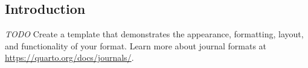 \documentclass{juliacon}
\begin{document}
\hypertarget{sec-intro}{%
\subsection{Introduction}\label{sec-intro}}

\emph{TODO} Create a template that demonstrates the appearance,
formatting, layout, and functionality of your format. Learn more about
journal formats at \url{https://quarto.org/docs/journals/}.
\end{document}
